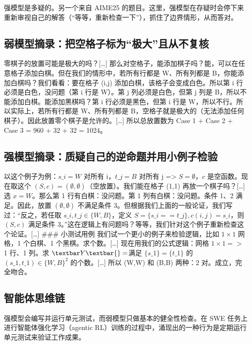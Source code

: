 \documentclass[
  10
]{article}
\begin{document}
强模型是多疑的。另一个来自 AIME25 的题目。这里，强模型在存疑时会停下来重新审视自己的解答（``等等，重新检查一下''），抓住了边界情形，从而答对。

\subsection{弱模型摘录：把空格子标为``极大''且从不复核}\label{weak-model-excerpt-labels-the-empty-grid-maximal-and-never-rechecks}

零棋子的放置可能是极大的吗？{[}\ldots{]} 那么对空格子，能添加棋子吗？能，可以在任意格子添加白棋。但在我们的情形中，若所有行都是 W、所有列都是 B，你能添加白棋吗？我们看看：要在格子 (i,j) 添加白棋，该格子会变成白色。所以第 i 行必须是白色，没问题（第 i 行是 W）。第 j 列必须是白色，但第 j 列是 B，所以不能添加白棋。能添加黑棋吗？第 i 行必须是黑色，但第 i 行是 W，所以不行。所以实际上，若所有行都是 W、所有列都是 B，空格子就是极大的（无法添加任何棋子）。因此放置零个棋子是允许的。{[}\ldots{]} 所以总放置数为 Case 1 + Case 2 + Case 3 = 960 + 32 + 32 = 1024。

\subsection{强模型摘录：质疑自己的逆命题并用小例子检验}\label{strong-model-excerpt-distrusts-its-own-converse-and-tests-it-on-a-small-case}

以这个例子为例：$s\_i=W$ 对所有 i，$t\_j=B$ 对所有 j =>{} $S=\emptyset$，$c$ 是空函数。现在取这个 $(S,c)=(\emptyset, \emptyset)$（空放置）。我们能在格子 (1,1) 再放一个棋子吗？{[}\ldots{]} 选 $x=W$。那么第 1 行有白棋：没问题。第 1 列有白棋：没问题。条件 1、2 满足。因此，放置 $(\emptyset, \emptyset)$ 不满足条件 3。但根据我们上面的一般论证，我们写过：``反之，若任取 $s\_i,t\_j \in \{W,B\}$，定义 $S=\{s\_i==t\_j\}, c(i,j)=s\_i$，则 $(S,c)$ 满足条件 3。''这在逻辑上有问题吗？等等，我们针对这个例子重新检查这个论证。{[}\ldots{]} \#\#\# 小测试用例 我们试一个更小的例子来检验逻辑，比如 $1\times 1$ 网格，1 个白棋、1 个黑棋。求个数。{[}\ldots{]} 现在用我们的公式逻辑：网格 $1\times 1 =>$ 1 行、1 列。求 $\textbar Y\textbar{} = $满足 $\{s\_1\} = \{t\_1\}$ 的 $(s\_1, t\_1) \in \{W,B\}^2$ 的个数。{[}\ldots{]} 所以 (W,W) 和 (B,B) 两种：2 对。成立，完全吻合。

\subsection{智能体思维链}\label{d.2-agentic-cots}

强模型会编写并运行单元测试，而弱模型只做基本的健全性检查。在 SWE 任务上进行智能体强化学习（agentic RL）训练的过程中，涌现出的一种行为是定期运行单元测试来验证工作成果。
\end{document}

